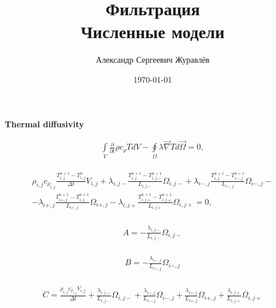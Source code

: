 \documentclass[a4paper,12pt,russian]{extreport}
\author{Александр Сергеевич Журавлёв}
\title{Фильтрация\\Численные модели}
\date{\today}
\begin{document}
\pagecolor{pageColor}
\color{fontColor}
\Russian
\printnomenclature[5em]

\begin{center}
{\large \textbf{Thermal diffusivity}}
\end{center}

\begin{eqnarray}
\label{eq:phys_TD}
\int \limits_{V} \frac{\partial}{\partial t} \rho c_{\rho} T d V - \oint \limits_{\Omega} \lambda \vec{\nabla}T d\vec{\Omega} = 0,
\end{eqnarray}

\begin{eqnarray}
\label{eq:num_TD}
\begin{gathered}
\rho_{i,j} c_{\rho_{i,j}} \frac{T^{n+1}_{i,j} - T^{n}_{i,j}}{\Delta t} V_{i,j} + \lambda_{i,j-}\frac{T^{n+1}_{i,j} - T^{n+1}_{i,j-}}{L_{i,j-}} \Omega_{i,j-} + \lambda_{i-,j}\frac{T^{n+1}_{i,j} - T^{n+1}_{i-,j}}{L_{i-,j}} \Omega_{i-,j} - \\
- \lambda_{i+,j}\frac{T^{n+1}_{i+,j} - T^{n+1}_{i,j}}{L_{i+,j}} \Omega_{i+,j} - \lambda_{i,j+}\frac{T^{n+1}_{i,j+} - T^{n+1}_{i,j+}}{L_{i,j+}} \Omega_{i,j+} = 0,
\end{gathered}
\end{eqnarray}

\begin{eqnarray}
\begin{gathered}
\label{eq:A_coeff}
A = - \frac{\lambda_{i,j-}}{L_{i,j-}} \Omega_{i,j-}
\end{gathered}
\end{eqnarray}

\begin{eqnarray}
\begin{gathered}
\label{eq:B_coeff}
B = - \frac{\lambda_{i-,j}}{L_{i-,j}} \Omega_{i-,j}
\end{gathered}
\end{eqnarray}

\begin{eqnarray}
\begin{gathered}
\label{eq:B_coeff}
C = \frac{\rho_{i,j} c_{\rho_{i,j}} V_{i,j}}{\Delta t} + \frac{\lambda_{i,j-}}{L_{i,j-}} \Omega_{i,j-} + \frac{\lambda_{i-,j}}{L_{i-,j}} \Omega_{i-,j} + \frac{\lambda_{i+,j}}{L_{i+,j}} \Omega_{i+,j} + \frac{\lambda_{i,j+}}{L_{i,j+}} \Omega_{i,j+}
\end{gathered}
\end{eqnarray}
\end{document}
